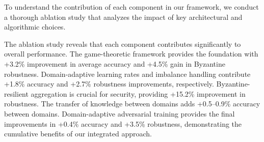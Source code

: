 \documentclass[12pt,a4paper]{article}
\theoremstyle{definition}
\begin{document}
To understand the contribution of each component in our framework, we conduct a thorough ablation study that analyzes the impact of key architectural and algorithmic choices.

\begin{table}[H]
\centering
\caption{Ablation Study: Component Contribution Analysis (\%)}
\label{tab:ablation_study}
\begingroup
\setlength{\tabcolsep}{4pt}
\renewcommand{\arraystretch}{1.05}
\endgroup
\end{table}

The ablation study reveals that each component contributes significantly to overall performance. The game-theoretic framework provides the foundation with +3.2\% improvement in average accuracy and +4.5\% gain in Byzantine robustness. Domain-adaptive learning rates and imbalance handling contribute +1.8\% accuracy and +2.7\% robustness improvements, respectively. Byzantine-resilient aggregation is crucial for security, providing +15.2\% improvement in robustness. The transfer of knowledge between domains adds +0.5--0.9\% accuracy between domains. Domain-adaptive adversarial training provides the final improvements in +0.4\% accuracy and +3.5\% robustness, demonstrating the cumulative benefits of our integrated approach.
\end{document}

